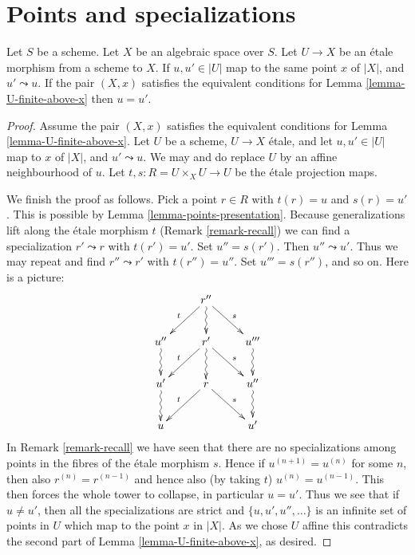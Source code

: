 \section{Points and specializations}
\label{section-specializations}

\begin{lemma}
\label{lemma-no-specializations-map-to-same-point}
Let $S$ be a scheme.
Let $X$ be an algebraic space over $S$.
Let $U \to X$ be an \'etale morphism from a scheme to $X$.
If $u, u' \in |U|$ map to the same point $x$ of $|X|$, and
$u' \leadsto u$. If the pair $(X, x)$ satisfies the
equivalent conditions for Lemma \ref{lemma-U-finite-above-x}
then $u = u'$.
\end{lemma}

\begin{proof}
Assume the pair $(X, x)$ satisfies the
equivalent conditions for Lemma \ref{lemma-U-finite-above-x}.
Let $U$ be a scheme, $U \to X$ \'etale, and
let $u, u' \in |U|$ map to $x$ of $|X|$, and
$u' \leadsto u$. We may and do replace $U$ by an affine
neighbourhood of $u$. Let $t, s : R = U \times_X U \to U$
be the \'etale projection maps.

\medskip\noindent
We finish the proof as follows.
Pick a point $r \in R$ with $t(r) = u$ and $s(r) = u'$.
This is possible by
Lemma \ref{lemma-points-presentation}.
Because generalizations lift along the \'etale morphism $t$
(Remark \ref{remark-recall}) we can find a specialization $r' \leadsto r$ with
$t(r') = u'$. Set $u'' = s(r')$. Then $u'' \leadsto u'$.
Thus we may repeat and find $r'' \leadsto r'$ with
$t(r'') = u''$. Set $u''' = s(r'')$, and so on.
Here is a picture:
$$
\xymatrix{
& r'' \ar[rd]^s \ar[ld]_t \ar@{~>}[d] & \\
u'' \ar@{~>}[d] & r' \ar[rd]^s \ar[ld]_t \ar@{~>}[d] & u''' \ar@{~>}[d] \\
u' \ar@{~>}[d] & r \ar[rd]^s \ar[ld]_t & u'' \ar@{~>}[d] \\
u & & u'
}
$$
In Remark \ref{remark-recall} we have seen that there are no specializations
among points in the fibres of the \'etale morphism $s$. Hence if
$u^{(n + 1)} = u^{(n)}$ for some $n$, then also $r^{(n)} = r^{(n - 1)}$ and
hence also (by taking $t$) $u^{(n)} = u^{(n - 1)}$. This then forces the
whole tower to collapse, in particular $u = u'$. Thus we see that if
$u \not = u'$, then all the specializations are strict and
$\{u, u', u'', \ldots\}$ is an infinite set of points in $U$ which map to the
point $x$ in $|X|$. As we chose $U$ affine this contradicts the second part of
Lemma \ref{lemma-U-finite-above-x}, as desired.
\end{proof}

